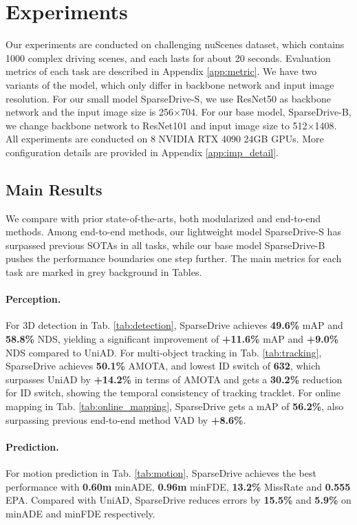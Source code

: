 
\section{Experiments} \label{experiments}
Our experiments are conducted on challenging nuScenes\cite{nuscenes} dataset, which contains 1000 complex driving scenes, and each lasts for about 20 seconds. Evaluation metrics of each task are described in Appendix \ref{app:metric}. We have two variants of the model, which only differ in backbone network and input image resolution. For our small model SparseDrive-S, we use ResNet50\cite{resnet} as backbone network and the input image size is 256$\times$704. For our base model, SparseDrive-B, we change backbone network to ResNet101 and input image size to 512$\times$1408. All experiments are conducted on 8 NVIDIA RTX 4090 24GB GPUs. More configuration details are provided in Appendix \ref{app:imp_detail}.

\subsection{Main Results}
We compare with prior state-of-the-arts, both modularized and end-to-end methods. Among end-to-end methods, our lightweight model SparseDrive-S has surpassed previous SOTAs in all tasks, while our base model SparseDrive-B pushes the performance boundaries one step further. The main metrics for each task are marked in grey background in Tables.

\paragraph{Perception.} For 3D detection in Tab. \ref{tab:detection}, SparseDrive achieves \textbf{49.6\%} mAP and \textbf{58.8\%} NDS, yielding a significant improvement of \textbf{+11.6\%} mAP and \textbf{+9.0\%} NDS compared to UniAD\cite{uniad}. For multi-object tracking in Tab. \ref{tab:tracking}, SparseDrive achieves \textbf{50.1\%} AMOTA, and lowest ID switch of \textbf{632}, which surpasses UniAD\cite{uniad} by \textbf{+14.2\%} in terms of AMOTA and gets a \textbf{30.2\%} reduction for ID switch, showing the temporal consistency of tracking tracklet. For online mapping in Tab. \ref{tab:online_mapping}, SparseDrive gets a mAP of \textbf{56.2\%}, also surpassing previous end-to-end method VAD\cite{vad} by \textbf{+8.6\%}.



\paragraph{Prediction.} For motion prediction in Tab. \ref{tab:motion}, SparseDrive achieves the best performance with \textbf{0.60m} minADE, \textbf{0.96m} minFDE, \textbf{13.2\%} MissRate and \textbf{0.555} EPA. Compared with UniAD\cite{uniad}, SparseDrive reduces errors by \textbf{15.5\%} and \textbf{5.9\%} on minADE and minFDE respectively.


